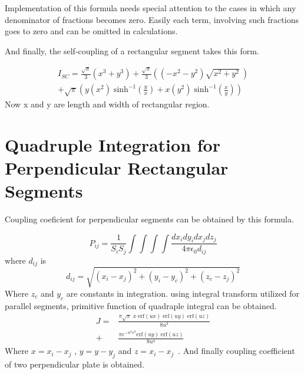 \documentclass[final,5p,times,twocolumn]{elsarticle}
\begin{document}
Implementation of this formula needs special attention to the cases in which any denominator of fractions becomes zero. Easily each term, involving such fractions goes to zero and can be omitted in calculations.


And finally, the self-coupling of a rectangular segment takes this form.

\begin{equation}\label {eq:20}
\begin {split}
I_{SC} = \frac {\sqrt{\pi} } {3} (x^3+y^3) 
+ \frac {\sqrt{\pi} } {3} \left((-x^2-y^2) \sqrt{x^2 + y^2}\ \right) \\ +\sqrt{\pi} \left( y(x^2 )\;\mathrm{sinh^{-1}}(\frac{y}{x})+x(y^2)\;\mathrm{sinh^{-1}}(\frac{x}{y})  \right)
\end {split}
\end{equation}
Now x and y are length and width of rectangular region.

\section{Quadruple Integration for Perpendicular Rectangular Segments}
Coupling coeficient for perpendicular segments can be obtained by this formula.

\begin{equation}
\label {eq21}
P_{ij} = \frac 1 {S_i S_j}\int \int \int \int \frac{dx_i dy_i dx_j dz_j}{4 \pi \epsilon_0 d_{ij}}
\end{equation} 
where $d _{ij}$ is 
\begin{equation}
\label {eq22}
d_{ij} = \sqrt{(x_i-x_j)^2 + (y_i-y_c)^2 + (z_c - z_j)^2}
\end{equation} 
Where $z_c$ and $y_c$ are constants in integration. using integral transform utilized for parallel segments, primitive function of quadraple integral can be obtained.
\begin{equation}
\label {eq23}
\begin{split}
J = &\frac{\pi\sqrt{\pi}\;x\; \mathrm {erf}(u x)\; \mathrm {erf}(u y)\; \mathrm {erf}(u z)}{8u^3}\\
+\; &\frac{\pi e^{-u^2 x^2} \mathrm{erf}(u y)\; \mathrm{erf}(u z)}{8u^4}
\end{split}
\end{equation}
Where $x = x_i - x_j$ , $y = y - y_j$ and $z = x_i - x_j$\ .
And finally coupling coefficient of two perpendicular plate is obtained.
\end{document}
